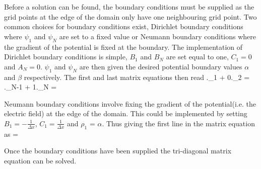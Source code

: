 Before a solution can be found, the boundary conditions must be supplied as the grid points at the edge of the domain only have one neighbouring grid point. Two common choices for boundary conditions exist, Dirichlet boundary conditions where $\psi_1$ and $\psi_N$ are set to a fixed value or Neumann boundary conditions where the gradient of the potential is fixed at the boundary. 
The implementation of Dirichlet boundary conditions is simple, $B_1$ and $B_N$ are set equal to one, $C_1 =0$ and $A_N = 0$. $\psi_1$ and $\psi_N$ are then given the desired potential boundary values $\alpha $ and $\beta$  respectively. The first and last matrix equations then read
.\psi_1 + 0.\psi_2 = \alpha 
\ee 
{}.\psi_{N-1} + 1.\psi_N = \beta 
\ee 

Neumann boundary conditions involve fixing the gradient of the potential(i.e. the electric field) at the edge of the domain. This could be implemented by setting $B_1  = -\frac{1}{\Delta x}$, $C_1 = \frac{1}{\Delta x}$ and $\rho_1$ = $\alpha$. Thus giving the first line in the matrix equation as 
\be 
{} = \alpha 
\ee 

Once the boundary conditions have been supplied the tri-diagonal matrix equation can be solved.
 
